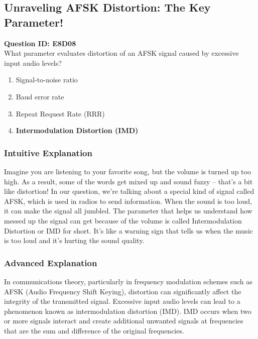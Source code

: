 \subsection{Unraveling AFSK Distortion: The Key Parameter!}

\begin{tcolorbox}
    \textbf{Question ID: E8D08}\\
    What parameter evaluates distortion of an AFSK signal caused by excessive input audio levels?\\
    \begin{enumerate}[label=\Alph*.]
        \item Signal-to-noise ratio
        \item Baud error rate
        \item Repeat Request Rate (RRR)
        \item \textbf{Intermodulation Distortion (IMD)}
    \end{enumerate}
\end{tcolorbox}

\subsubsection{Intuitive Explanation}
Imagine you are listening to your favorite song, but the volume is turned up too high. As a result, some of the words get mixed up and sound fuzzy – that's a bit like distortion! In our question, we're talking about a special kind of signal called AFSK, which is used in radios to send information. When the sound is too loud, it can make the signal all jumbled. The parameter that helps us understand how messed up the signal can get because of the volume is called Intermodulation Distortion or IMD for short. It’s like a warning sign that tells us when the music is too loud and it’s hurting the sound quality.

\subsubsection{Advanced Explanation}
In communications theory, particularly in frequency modulation schemes such as AFSK (Audio Frequency Shift Keying), distortion can significantly affect the integrity of the transmitted signal. Excessive input audio levels can lead to a phenomenon known as intermodulation distortion (IMD). IMD occurs when two or more signals interact and create additional unwanted signals at frequencies that are the sum and difference of the original frequencies. 

